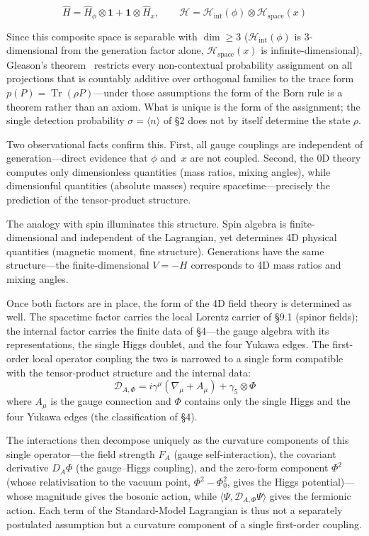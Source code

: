 \documentclass[12pt,a4paper]{article}
\begin{document}
\[\hat{H} = \hat{H}_\phi \otimes \mathbf{1} + \mathbf{1} \otimes \hat{H}_x,\qquad \mathcal{H} = \mathcal{H}_\mathrm{int}(\phi) \otimes \mathcal{H}_\mathrm{space}(x)\]

Since this composite space is separable with $\dim \geq 3$
($\mathcal{H}_\mathrm{int}(\phi)$ is 3-dimensional from the generation factor alone,
$\mathcal{H}_\mathrm{space}(x)$ is infinite-dimensional),
Gleason's theorem~\cite{gleason} restricts every non-contextual probability assignment on all projections that is countably additive over orthogonal families to the trace form $p(P) = \operatorname{Tr}(\rho P)$---under those assumptions the form of the Born rule is a theorem rather than an axiom. What is unique is the form of the assignment; the single detection probability $\sigma = \langle n \rangle$ of \S2 does not by itself determine the state $\rho$.

Two observational facts confirm this.
First, all gauge couplings are independent of
generation---direct evidence that $\phi$ and~$x$
are not coupled.
Second, the 0D theory computes only dimensionless quantities
(mass ratios, mixing angles),
while dimensionful quantities (absolute masses) require
spacetime---precisely the prediction of the
tensor-product structure.

The analogy with spin illuminates this structure.
Spin algebra is finite-dimensional and independent of the
Lagrangian, yet determines 4D physical quantities
(magnetic moment, fine structure).
Generations have the same structure---the finite-dimensional
$V = -H$ corresponds to 4D mass ratios and mixing angles.

Once both factors are in place, the form of the 4D field theory is determined as well. The spacetime factor carries the local Lorentz carrier of \S9.1 (spinor fields); the internal factor carries the finite data of \S4---the gauge algebra with its representations, the single Higgs doublet, and the four Yukawa edges. The first-order local operator coupling the two is narrowed to a single form compatible with the tensor-product structure and the internal data:
\begin{equation}
\mathcal{D}_{A,\Phi} = i\gamma^\mu(\nabla_\mu + A_\mu) + \gamma_5 \otimes \Phi
\end{equation}
where $A_\mu$ is the gauge connection and $\Phi$ contains only the single Higgs and the four Yukawa edges (the classification of \S4).

The interactions then decompose uniquely as the curvature components of this single operator---the field strength $F_A$ (gauge self-interaction), the covariant derivative $D_A\Phi$ (the gauge--Higgs coupling), and the zero-form component $\Phi^2$ (whose relativisation to the vacuum point, $\Phi^2 - \Phi_0^2$, gives the Higgs potential)---whose magnitude gives the bosonic action, while $\langle\Psi, \mathcal{D}_{A,\Phi}\Psi\rangle$ gives the fermionic action. Each term of the Standard-Model Lagrangian is thus not a separately postulated assumption but a curvature component of a single first-order coupling.
\end{document}
